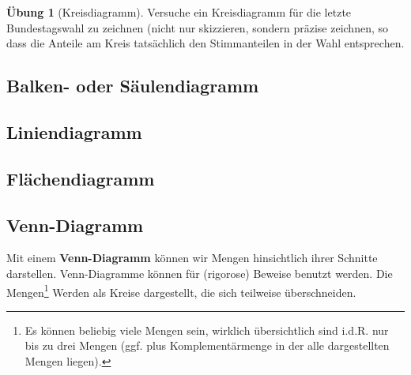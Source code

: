 \documentclass[a4paper]{book}%
\theoremstyle{definition}
\newtheorem{uebung}{Übung}
\begin{document}
\begin{uebung}[Kreisdiagramm]
    Versuche ein Kreisdiagramm für die letzte Bundestagswahl zu zeichnen (nicht nur skizzieren, sondern präzise zeichnen, so dass die Anteile am Kreis tatsächlich den Stimmanteilen in der Wahl entsprechen.
\end{uebung}

\subsection{Balken- oder Säulendiagramm}

\subsection{Liniendiagramm}

\subsection{Flächendiagramm}


\subsection{Venn-Diagramm}\label{VennDiagramme}

Mit einem \textbf{Venn-Diagramm} können wir Mengen hinsichtlich ihrer Schnitte darstellen. Venn-Diagramme können für (rigorose) Beweise benutzt werden. Die Mengen\footnote{Es können beliebig viele Mengen sein, wirklich übersichtlich sind i.d.R. nur bis zu drei Mengen (ggf. plus Komplementärmenge in der alle dargestellten Mengen liegen).} Werden als Kreise dargestellt, die sich teilweise überschneiden.
\end{document}
